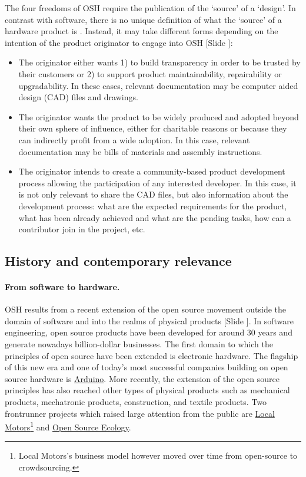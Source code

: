 \documentclass{article}
\newcounter{slide}
\begin{document}
The four freedoms of OSH require the publication of the `source' of a `design'. In contrast with software, there is no unique definition of what the `source' of a hardware product is \cite{bonvoisinWhatSourceOpen2017}. Instead, it may take different forms depending on the intention of the product originator to engage into OSH {\color{blue}[Slide ]}:
\begin{itemize}
  \item The originator either wants 1) to build transparency in order to be trusted by their customers or 2) to support product maintainability, repairability or upgradability. In these cases, relevant documentation may be computer aided design (CAD) files and drawings.
  \item The originator wants the product to be widely produced and adopted beyond their own sphere of influence, either for charitable reasons or because they can indirectly profit from a wide adoption. In this case, relevant documentation may be bills of materials and assembly instructions.
  \item The originator intends to create a community-based product development process allowing the participation of any interested developer. In this case, it is not only relevant to share the CAD files, but also information about the development process: what are the expected requirements for the product, what has been already achieved and what are the pending tasks, how can a contributor join in the project, etc.
\end{itemize}

\subsection{History and contemporary relevance}
\label{sec:OSHhistory}
\paragraph{From software to hardware.} OSH results from a recent extension of the open source movement outside the domain of software and into the realms of physical products {\color{blue}[Slide ]}. In software engineering, open source products have been developed for around 30 years and generate nowadays billion-dollar businesses. The first domain to which the principles of open source have been extended is electronic hardware. The flagship of this new era and one of today's most successful companies building on open source hardware is \href{https://www.arduino.cc/}{Arduino}. More recently, the extension of the open source principles has also reached other types of physical products such as mechanical products, mechatronic products, construction, and textile products. Two frontrunner projects which raised large attention from the public are \href{https://localmotors.com/}{Local Motors}\footnote{Local Motors's business model however moved over time from open-source to crowdsourcing.} and \href{https://www.opensourceecology.org/}{Open Source Ecology}. 
\end{document}

